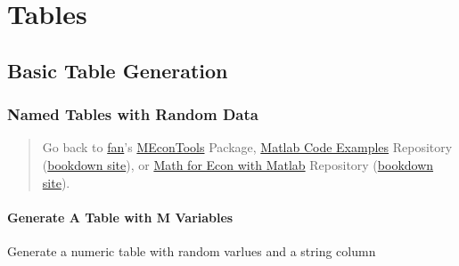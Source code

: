 \documentclass[
]{book}
\begin{document}
\hypertarget{tables}{%
\chapter{Tables}\label{tables}}

\hypertarget{basic-table-generation}{%
\section{Basic Table Generation}\label{basic-table-generation}}

\hypertarget{named-tables-with-random-data}{%
\subsection{Named Tables with Random Data}\label{named-tables-with-random-data}}

\begin{quote}
Go back to \href{http://fanwangecon.github.io/}{fan}'s \href{https://fanwangecon.github.io/MEconTools/}{MEconTools} Package, \href{https://fanwangecon.github.io/M4Econ/}{Matlab Code Examples} Repository (\href{https://fanwangecon.github.io/M4Econ/bookdown}{bookdown site}), or \href{https://fanwangecon.github.io/Math4Econ/}{Math for Econ with Matlab} Repository (\href{https://fanwangecon.github.io/Math4Econ/bookdown}{bookdown site}).
\end{quote}

\hypertarget{generate-a-table-with-m-variables}{%
\subsubsection{Generate A Table with M Variables}\label{generate-a-table-with-m-variables}}

Generate a numeric table with random varlues and a string column
\end{document}
